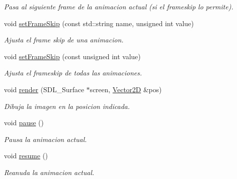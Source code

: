\begin{DoxyCompactItemize}
\begin{DoxyCompactList}\small\item\em Pasa al siguiente frame de la animacion actual (si el frameskip lo permite). \end{DoxyCompactList}\item 
void \hyperlink{class_sprite_sheet_aef9b39ad26d9558fb74da2fb5b38b468}{set\-Frame\-Skip} (const std\-::string name, unsigned int value)
\begin{DoxyCompactList}\small\item\em Ajusta el frame skip de una animacion. \end{DoxyCompactList}\item 
void \hyperlink{class_sprite_sheet_a875c5f4942c40f42cc8e68a00cce0c07}{set\-Frame\-Skip} (const unsigned int value)
\begin{DoxyCompactList}\small\item\em Ajusta el frameskip de todas las animaciones. \end{DoxyCompactList}\item 
void \hyperlink{class_sprite_sheet_ac2f0e4436e15fb7c8d297476f0bfeeb0}{render} (S\-D\-L\-\_\-\-Surface $\ast$screen, \hyperlink{class_vector2_d}{Vector2\-D} \&pos)
\begin{DoxyCompactList}\small\item\em Dibuja la imagen en la posicion indicada. \end{DoxyCompactList}\item 
\hypertarget{class_sprite_sheet_a40ed270049d05bde987ad9b863976be6}{void \hyperlink{class_sprite_sheet_a40ed270049d05bde987ad9b863976be6}{pause} ()}\label{class_sprite_sheet_a40ed270049d05bde987ad9b863976be6}

\begin{DoxyCompactList}\small\item\em Pausa la animacion actual. \end{DoxyCompactList}\item 
\hypertarget{class_sprite_sheet_a3ac97acde1d03b7cff130b0dda49904f}{void \hyperlink{class_sprite_sheet_a3ac97acde1d03b7cff130b0dda49904f}{resume} ()}\label{class_sprite_sheet_a3ac97acde1d03b7cff130b0dda49904f}

\begin{DoxyCompactList}\small\item\em Reanuda la animacion actual. \end{DoxyCompactList}\end{DoxyCompactItemize}


